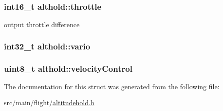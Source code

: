\hypertarget{structalthold_a1d7fb963289fcec2606caa41d97d1fb8}{
\subsubsection[{throttle}]{\setlength{\rightskip}{0pt plus 5cm}int16\+\_\+t althold\+::throttle}}\label{structalthold_a1d7fb963289fcec2606caa41d97d1fb8}


output throttle difference 

\hypertarget{structalthold_a29ed3693e215bf937d579133ae70a982}{
\subsubsection[{vario}]{\setlength{\rightskip}{0pt plus 5cm}int32\+\_\+t althold\+::vario}}\label{structalthold_a29ed3693e215bf937d579133ae70a982}
\hypertarget{structalthold_a265f9d24449ff559d1c771e7dc1ae59f}{
\subsubsection[{velocity\+Control}]{\setlength{\rightskip}{0pt plus 5cm}uint8\+\_\+t althold\+::velocity\+Control}}\label{structalthold_a265f9d24449ff559d1c771e7dc1ae59f}


The documentation for this struct was generated from the following file\+:\begin{DoxyCompactItemize}
\item 
src/main/flight/\hyperlink{flight_2altitudehold_8h}{altitudehold.\+h}\end{DoxyCompactItemize}

